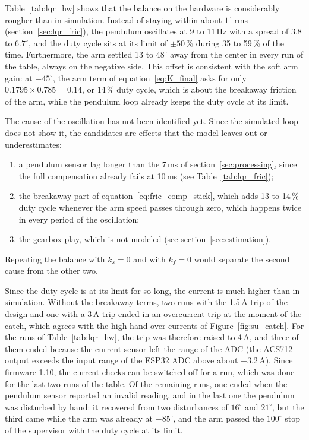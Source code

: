 \documentclass[a4paper,11pt]{article}
\begin{document}
Table~\ref{tab:lqr_hw} shows that the balance on the hardware is considerably rougher than in simulation. Instead of staying within about $1^\circ$ rms (section~\ref{sec:lqr_fric}), the pendulum oscillates at 9 to 11\,Hz with a spread of 3.8 to $6.7^\circ$, and the duty cycle sits at its limit of $\pm 50\,\%$ during 35 to 59\,\% of the time. Furthermore, the arm settled 13 to $48^\circ$ away from the center in every run of the table, always on the negative side. This offset is consistent with the soft arm gain: at $-45^\circ$, the arm term of equation~\ref{eq:K_final} asks for only $0.1795 \times 0.785 = 0.14$, or 14\,\% duty cycle, which is about the breakaway friction of the arm, while the pendulum loop already keeps the duty cycle at its limit.

The cause of the oscillation has not been identified yet. Since the simulated loop does not show it, the candidates are effects that the model leaves out or underestimates:
\begin{enumerate}
  \item a pendulum sensor lag longer than the 7\,ms of section~\ref{sec:processing}, since the full compensation already fails at 10\,ms (see Table~\ref{tab:lqr_fric});
  \item the breakaway part of equation~\ref{eq:fric_comp_stick}, which adds 13 to 14\,\% duty cycle whenever the arm speed passes through zero, which happens twice in every period of the oscillation;
  \item the gearbox play, which is not modeled (see section~\ref{sec:estimation}).
\end{enumerate}
Repeating the balance with $k_s = 0$ and with $k_f = 0$ would separate the second cause from the other two.

Since the duty cycle is at its limit for so long, the current is much higher than in simulation. Without the breakaway terms, two runs with the 1.5\,A trip of the design and one with a 3\,A trip ended in an overcurrent trip at the moment of the catch, which agrees with the high hand-over currents of Figure~\ref{fig:su_catch}. For the runs of Table~\ref{tab:lqr_hw}, the trip was therefore raised to 4\,A, and three of them ended because the current sensor left the range of the ADC (the ACS712 output exceeds the input range of the ESP32 ADC above about $+3.2\,\mathrm{A}$). Since firmware 1.10, the current checks can be switched off for a run, which was done for the last two runs of the table. Of the remaining runs, one ended when the pendulum sensor reported an invalid reading, and in the last one the pendulum was disturbed by hand: it recovered from two disturbances of $16^\circ$ and $21^\circ$, but the third came while the arm was already at $-85^\circ$, and the arm passed the $100^\circ$ stop of the supervisor with the duty cycle at its limit.
\end{document}
